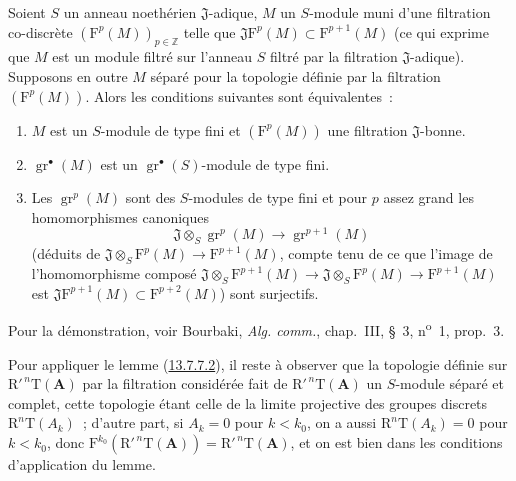 \begin{lemma}[13.7.7.2]
\label{0.13.7.7.2-fr}
Soient $S$ un anneau noethérien $\mathfrak J$-adique, $M$ un $S$-module muni
d'une filtration co-discrète $(\mathrm F^p(M))_{p\in\mathbb Z}$ telle que
$\mathfrak J\mathrm F^p(M)\subset\mathrm F^{p+1}(M)$ (ce qui exprime que
$M$ est un module filtré sur l'anneau $S$ filtré par la filtration
$\mathfrak J$-adique). Supposons en outre $M$ séparé pour la topologie définie
par la filtration $(\mathrm F^p(M))$. Alors les conditions suivantes sont
équivalentes~:
\begin{enumerate}
\item[\rm a)] $M$ est un $S$-module de type fini et $(\mathrm F^p(M))$ une
filtration $\mathfrak J$-bonne.
\item[\rm b)] $\operatorname{gr}^\bullet(M)$ est un
$\operatorname{gr}^\bullet(S)$-module de type fini.
\item[\rm c)] Les $\operatorname{gr}^p(M)$ sont des $S$-modules de type fini
et pour $p$ assez grand les homomorphismes canoniques
\begin{equation}
\label{0.13.7.7.3-fr}
\tag{13.7.7.3}
\mathfrak J\otimes_S\operatorname{gr}^p(M)\longrightarrow
\operatorname{gr}^{p+1}(M)
\end{equation}
(déduits de
$\mathfrak J\otimes_S\mathrm F^p(M)\to\mathrm F^{p+1}(M)$, compte tenu de ce
que l'image de l'homomorphisme composé
$\mathfrak J\otimes_S\mathrm F^{p+1}(M)\to
\mathfrak J\otimes_S\mathrm F^p(M)\to\mathrm F^{p+1}(M)$
est $\mathfrak J\mathrm F^{p+1}(M)\subset\mathrm F^{p+2}(M)$) sont
surjectifs.
\end{enumerate}
\end{lemma}
Pour la démonstration, voir Bourbaki, \emph{Alg. comm.}, chap.~III, \S~3,
n\textsuperscript{o}~1, prop.~3.

\begin{env}[13.7.7.4]
\label{0.13.7.7.4-fr}
Pour appliquer le lemme (\hyperref[0.13.7.7.2-fr]{13.7.7.2}), il reste à
observer que la topologie définie sur
$\mathrm R'^{\,n}\mathrm T(\mathbf A)$ par la filtration considérée fait de
$\mathrm R'^{\,n}\mathrm T(\mathbf A)$ un $S$-module séparé et complet,
cette topologie étant celle de la limite projective des groupes discrets
$\mathrm R^n\mathrm T(A_k)$~; d'autre part, si $A_k=0$ pour $k<k_0$, on a
aussi $\mathrm R^n\mathrm T(A_k)=0$ pour $k<k_0$, donc
$\mathrm F^{k_0}(\mathrm R'^{\,n}\mathrm T(\mathbf A))=
\mathrm R'^{\,n}\mathrm T(\mathbf A)$, et on est bien dans les conditions
d'application du lemme.
\end{env}

